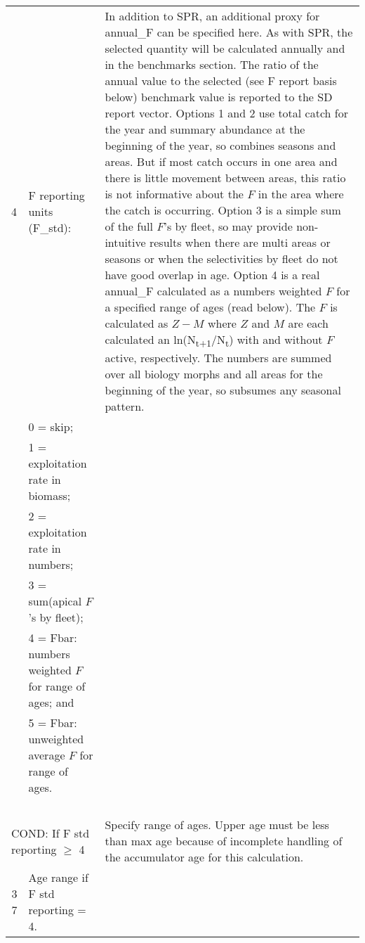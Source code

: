 {\begin{landscape}
\begin{longtable}{p{1.5cm} p{7.2cm} p{12.3cm}}
\hline 
 4 & F reporting units (F\_std): & \multirow{1}{1cm}[-0.25cm]{\parbox{12.5cm}{In addition to SPR, an additional proxy for annual\_F can be specified here. As with SPR, the selected quantity will be calculated annually and in the benchmarks section. The ratio of the annual value to the selected (see F report basis below) benchmark value is reported to the SD report vector. Options 1 and 2 use total catch for the year and summary abundance at the beginning of the year, so combines seasons and areas. But if most catch occurs in one area and there is little movement between areas, this ratio is not informative about the $F$ in the area where the catch is occurring. Option 3 is a simple sum of the full $F$'s by fleet, so may provide non-intuitive results when there are multi areas or seasons or when the selectivities by fleet do not have good overlap in age. Option 4 is a real annual\_F calculated as a numbers weighted $F$ for a specified range of ages (read below). The $F$ is calculated as $Z-M$ where $Z$ and $M$ are each calculated an ln(N\textsubscript{t+1}/N\textsubscript{t}) with and without $F$ active, respectively. The numbers are summed over all biology morphs and all areas for the beginning of the year, so subsumes any seasonal pattern.}} \Tstrut\Bstrut\\
   & 0 = skip; & \\
   & 1 = exploitation rate in biomass; & \\
   & 2 = exploitation rate in numbers; & \\
   & 3 = sum(apical $F$'s by fleet); & \\
   & 4 = Fbar: numbers weighted $F$ for range of ages; and & \\
   & 5 = Fbar: unweighted average $F$ for range of ages. & \\
   & & \\
   & & \\
   & & \Bstrut\\
   & & \Bstrut\\ 
  
 \hline
 \multicolumn{2}{l}{COND: If F std reporting $\geq$ 4} & \multirow{1}{1cm}[-0.25cm]{\parbox{12.5cm}{Specify range of ages. Upper age must be less than max age because of incomplete handling of the accumulator age for this calculation.}} \Tstrut\\
 \multicolumn{1}{r}{3 7}  & Age range if F std reporting = 4. & \Tstrut\Bstrut\\


\end{longtable}
\end{landscape}}
